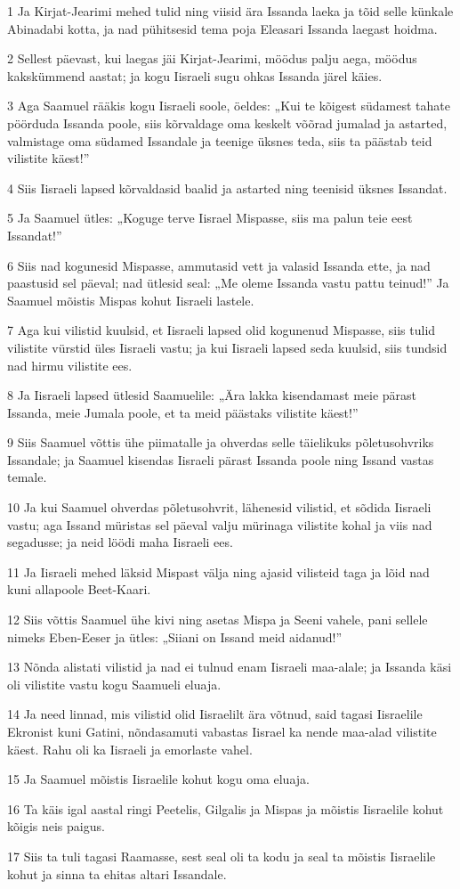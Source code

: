 \par 1 Ja Kirjat-Jearimi mehed tulid ning viisid ära Issanda laeka ja tõid selle künkale Abinadabi kotta, ja nad pühitsesid tema poja Eleasari Issanda laegast hoidma.
\par 2 Sellest päevast, kui laegas jäi Kirjat-Jearimi, möödus palju aega, möödus kakskümmend aastat; ja kogu Iisraeli sugu ohkas Issanda järel käies.
\par 3 Aga Saamuel rääkis kogu Iisraeli soole, öeldes: „Kui te kõigest südamest tahate pöörduda Issanda poole, siis kõrvaldage oma keskelt võõrad jumalad ja astarted, valmistage oma südamed Issandale ja teenige üksnes teda, siis ta päästab teid vilistite käest!”
\par 4 Siis Iisraeli lapsed kõrvaldasid baalid ja astarted ning teenisid üksnes Issandat.
\par 5 Ja Saamuel ütles: „Koguge terve Iisrael Mispasse, siis ma palun teie eest Issandat!”
\par 6 Siis nad kogunesid Mispasse, ammutasid vett ja valasid Issanda ette, ja nad paastusid sel päeval; nad ütlesid seal: „Me oleme Issanda vastu pattu teinud!” Ja Saamuel mõistis Mispas kohut Iisraeli lastele.
\par 7 Aga kui vilistid kuulsid, et Iisraeli lapsed olid kogunenud Mispasse, siis tulid vilistite vürstid üles Iisraeli vastu; ja kui Iisraeli lapsed seda kuulsid, siis tundsid nad hirmu vilistite ees.
\par 8 Ja Iisraeli lapsed ütlesid Saamuelile: „Ära lakka kisendamast meie pärast Issanda, meie Jumala poole, et ta meid päästaks vilistite käest!”
\par 9 Siis Saamuel võttis ühe piimatalle ja ohverdas selle täielikuks põletusohvriks Issandale; ja Saamuel kisendas Iisraeli pärast Issanda poole ning Issand vastas temale.
\par 10 Ja kui Saamuel ohverdas põletusohvrit, lähenesid vilistid, et sõdida Iisraeli vastu; aga Issand müristas sel päeval valju mürinaga vilistite kohal ja viis nad segadusse; ja neid löödi maha Iisraeli ees.
\par 11 Ja Iisraeli mehed läksid Mispast välja ning ajasid vilisteid taga ja lõid nad kuni allapoole Beet-Kaari.
\par 12 Siis võttis Saamuel ühe kivi ning asetas Mispa ja Seeni vahele, pani sellele nimeks Eben-Eeser ja ütles: „Siiani on Issand meid aidanud!”
\par 13 Nõnda alistati vilistid ja nad ei tulnud enam Iisraeli maa-alale; ja Issanda käsi oli vilistite vastu kogu Saamueli eluaja.
\par 14 Ja need linnad, mis vilistid olid Iisraelilt ära võtnud, said tagasi Iisraelile Ekronist kuni Gatini, nõndasamuti vabastas Iisrael ka nende maa-alad vilistite käest. Rahu oli ka Iisraeli ja emorlaste vahel.
\par 15 Ja Saamuel mõistis Iisraelile kohut kogu oma eluaja.
\par 16 Ta käis igal aastal ringi Peetelis, Gilgalis ja Mispas ja mõistis Iisraelile kohut kõigis neis paigus.
\par 17 Siis ta tuli tagasi Raamasse, sest seal oli ta kodu ja seal ta mõistis Iisraelile kohut ja sinna ta ehitas altari Issandale.

